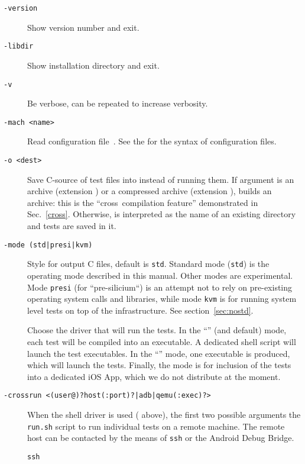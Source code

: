 \begin{description}
\item[{\tt -version}] Show version number and exit.
\item[{\tt -libdir}] Show installation directory and exit.
\item[{\tt -v}] Be verbose, can be repeated to increase verbosity.
\item[{\tt -mach <name>}] Read configuration file~.
See the 
for the syntax of configuration files.
\item[{\tt -o <dest>}]
Save C-source of test files into  instead of running them.
If  argument  is an archive (extension )
or a compressed archive (extension ),
\litmus{} builds an archive: this is the ``cross~compilation feature''
demonstrated in Sec.~\ref{cross}.
Otherwise,  is interpreted as the name of an
existing directory and tests are saved in it.
\item[{\tt -mode (std|presi|kvm)}]
Style for output C files, default is \texttt{std}.
Standard mode (\texttt{std}) is the operating mode described in this manual.
Other modes are experimental. Mode \texttt{presi} (for ``pre-silicium``) is an attempt not to rely on pre-existing operating system calls and libraries, while mode \texttt{kvm} is for running system level tests on top of the
infrastructure. See section~\ref{sec:nostd}.
\item[{\tt {}}]
Choose the driver that will run the tests.
In the ``'' (and default) mode,
each test will be compiled into an executable. A dedicated shell script
 will launch the test executables.
In the ``'' mode, one executable  is produced, which
will launch the tests.
Finally, the  mode is for inclusion of the tests into
a dedicated iOS App, which we do not distribute at the moment.
\item[{\tt -crossrun <(user@)?host(:port)?|adb|qemu(:exec)?>}]
When the shell driver is used ( above),
the first two possible arguments 
the \texttt{run.sh} script to run individual tests on a remote machine.
The remote host can be contacted by the means of \texttt{ssh}
or the Android Debug Bridge.
\begin{description}
\item[\tt ssh]

\end{description}
\end{description}
